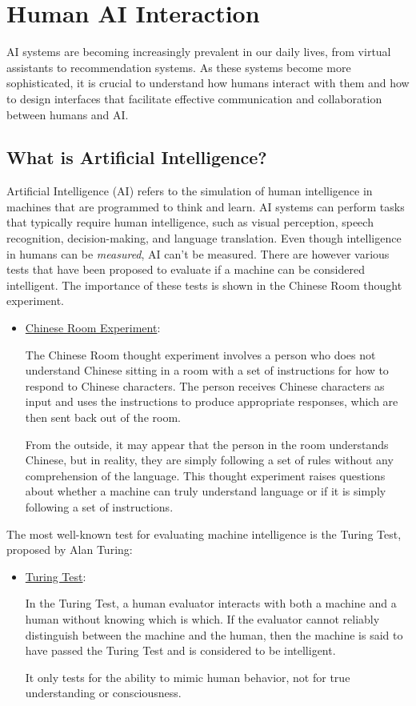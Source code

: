 \chapter{Human AI Interaction}

AI systems are becoming increasingly prevalent in our daily lives, from virtual assistants to recommendation systems. As these systems become more sophisticated, it is crucial to understand how humans interact with them and how to design interfaces that facilitate effective communication and collaboration between humans and AI.

\section{What is Artificial Intelligence?}

Artificial Intelligence (AI) refers to the simulation of human intelligence in machines that are programmed to think and learn. AI systems can perform tasks that typically require human intelligence, such as visual perception, speech recognition, decision-making, and language translation. Even though intelligence in humans can be \emph{measured}, AI can't be measured. There are however various tests that have been proposed to evaluate if a machine can be considered intelligent. The importance of these tests is shown in the Chinese Room thought experiment.
\begin{itemize}
    \item \ul{Chinese Room Experiment}:
    
    The Chinese Room thought experiment involves a person who does not understand Chinese sitting in a room with a set of instructions for how to respond to Chinese characters. The person receives Chinese characters as input and uses the instructions to produce appropriate responses, which are then sent back out of the room.
    
    From the outside, it may appear that the person in the room understands Chinese, but in reality, they are simply following a set of rules without any comprehension of the language. This thought experiment raises questions about whether a machine can truly understand language or if it is simply following a set of instructions.
\end{itemize}

The most well-known test for evaluating machine intelligence is the Turing Test, proposed by Alan Turing:
\begin{itemize}
    \item \ul{Turing Test}:
    
    In the Turing Test, a human evaluator interacts with both a machine and a human without knowing which is which. If the evaluator cannot reliably distinguish between the machine and the human, then the machine is said to have passed the Turing Test and is considered to be intelligent.

    It only tests for the ability to mimic human behavior, not for true understanding or consciousness.
\end{itemize}

